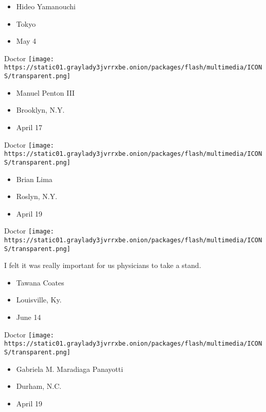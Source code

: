 \begin{itemize}
\tightlist
\item
  Hideo Yamanouchi
\item
  Tokyo
\item
  May 4
\end{itemize}

\protect\hyperlink{item-manuel-penton-iii}{}

Doctor
\texttt{[image: https://static01.graylady3jvrrxbe.onion/packages/flash/multimedia/ICONS/transparent.png]}

\begin{itemize}
\tightlist
\item
  Manuel Penton III
\item
  Brooklyn, N.Y.
\item
  April 17
\end{itemize}

\protect\hyperlink{item-brian-lima}{}

Doctor
\texttt{[image: https://static01.graylady3jvrrxbe.onion/packages/flash/multimedia/ICONS/transparent.png]}

\begin{itemize}
\tightlist
\item
  Brian Lima
\item
  Roslyn, N.Y.
\item
  April 19
\end{itemize}

\protect\hyperlink{item-tawana-coates}{}

Doctor
\texttt{[image: https://static01.graylady3jvrrxbe.onion/packages/flash/multimedia/ICONS/transparent.png]}

I felt it was really important for us physicians to take a stand.

\begin{itemize}
\tightlist
\item
  Tawana Coates
\item
  Louisville, Ky.
\item
  June 14
\end{itemize}

\protect\hyperlink{item-gabriela-m-maradiaga-panayotti}{}

Doctor
\texttt{[image: https://static01.graylady3jvrrxbe.onion/packages/flash/multimedia/ICONS/transparent.png]}

\begin{itemize}
\tightlist
\item
  Gabriela M. Maradiaga Panayotti
\item
  Durham, N.C.
\item
  April 19
\end{itemize}

